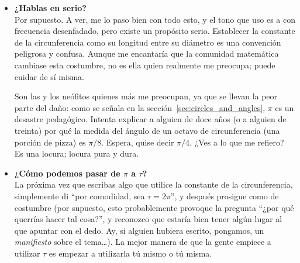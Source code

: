 \begin{itemize}

  \item \textbf{¿Hablas en serio?} \\ Por supuesto. A ver, me lo paso bien con todo esto, y el tono que uso es a con frecuencia desenfadado, pero existe un propósito serio. Establecer la constante de la circunferencia como su longitud entre su diámetro es una convención peligrosa y confusa. Aunque me encantaría que la comunidad matemática cambiase esta costumbre, no es ella quien realmente me preocupa; puede cuidar de sí misma.

Son las y los neófitos quienes más me preocupan, ya que se llevan la peor parte del daño: como se señala en la sección~\ref{sec:circles_and_angles}, $\pi$ es un desastre pedagógico. Intenta explicar a alguien de doce años (o a alguien de treinta) por qué la medida del ángulo de un octavo de circunferencia (una porción de pizza) es $\pi/8$. Espera, quise decir $\pi/4$. ¿Ves a lo que me refiero? Es una locura; locura pura y dura.

  \item \textbf{¿Cómo podemos pasar de $\pi$ a $\tau$?} \\ La próxima vez que escribas algo que utilice la constante de la circunferencia, simplemente di ``por comodidad, sea $\tau = 2\pi$'', y después prosigue como de costumbre (por supuesto, esto probablemente provoque la pregunta ``¿por qué querrías hacer tal cosa?'', y reconozco que estaría bien tener algún lugar al que apuntar con el dedo. Ay, si alguien hubiera escrito, pongamos, un \emph{manifiesto} sobre el tema\ldots). La mejor manera de que la gente empiece a utilizar $\tau$ es empezar a utilizarla tú mismo o tú misma.


\end{itemize}
